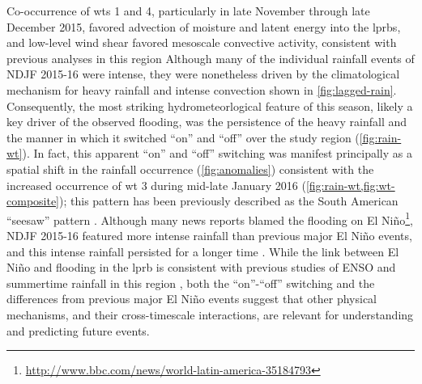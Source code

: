 \documentclass[twocol]{ametsoc}
\begin{document}
Co-occurrence of \glspl{wt} 1 and 4, particularly in late November through late December 2015, favored advection of moisture and latent energy into the \glspl{lprb}, and low-level wind shear favored mesoscale convective activity, consistent with previous analyses in this region \citep{Velasco1987,Marengo2004,Saulo2007,Salio2007}
Although many of the individual rainfall events of NDJF 2015-16 were intense, they were nonetheless driven by the climatological mechanism for heavy rainfall and intense convection shown in \cref{fig:lagged-rain}.
Consequently, the most striking hydrometeorlogical feature of this season, likely a key driver of the observed flooding, was the persistence of the heavy rainfall and the manner in which it switched ``on'' and ``off'' over the study region (\cref{fig:rain-wt}).
In fact, this apparent ``on'' and ``off'' switching was manifest principally as a spatial shift in the rainfall occurrence (\cref{fig:anomalies}) consistent with the increased occurrence of \gls{wt} 3 during mid-late January 2016 (\cref{fig:rain-wt,fig:wt-composite}); this pattern has been previously described as the South American ``seesaw'' pattern \citep{Nogues-Paegle1997}.
Although many news reports blamed the flooding on El Ni\~{n}o\footnote{\url{http://www.bbc.com/news/world-latin-america-35184793}}, NDJF 2015-16 featured more intense rainfall than previous major El Ni\~no events, and this intense rainfall persisted for a longer time .
While the link between El Ni\~{n}o and flooding in the \gls{lprb} is consistent with previous studies of ENSO and summertime rainfall in this region \citep{Velasco1987,Grimm2000,Salio2002,Grimm2003,Carvalho2004,Grimm2009a,Bravo2011}, both the ``on''-``off'' switching and the differences from previous major El Ni\~{n}o events suggest that other physical mechanisms, and their cross-timescale interactions, are relevant for understanding and predicting future events.
\end{document}
